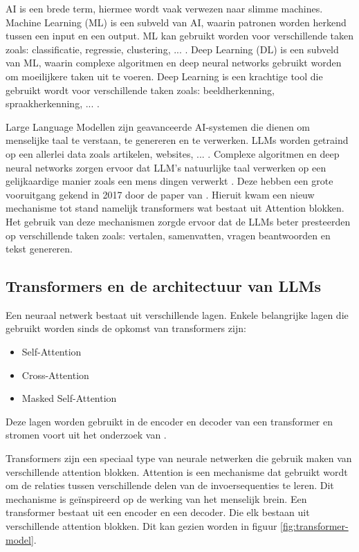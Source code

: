 AI is een brede term, hiermee wordt vaak verwezen naar slimme machines. 
Machine Learning (ML) is een subveld van AI, waarin patronen worden herkend tussen een input en een output.
ML kan gebruikt worden voor verschillende taken zoals: classificatie, regressie, clustering, ... .
Deep Learning (DL) is een subveld van ML, waarin complexe algoritmen en deep neural networks gebruikt worden om moeilijkere taken uit te voeren.
Deep Learning is een krachtige tool die gebruikt wordt voor verschillende taken zoals: beeldherkenning, spraakherkenning, ... \autocite{Stoeffelbauer2023}.

Large Language Modellen zijn geavanceerde AI-systemen die dienen om menselijke taal te verstaan, te genereren en te verwerken.
LLMs worden getraind op een allerlei data zoals artikelen, websites, ... . 
Complexe algoritmen en deep neural networks zorgen ervoor dat LLM's natuurlijke taal verwerken op een gelijkaardige manier zoals een mens dingen verwerkt \autocite{Beelen2023}.
Deze hebben een grote vooruitgang gekend in 2017 door de paper van \textcite{VaswaniEtAl2017}. 
Hieruit kwam een nieuw mechanisme tot stand namelijk transformers wat bestaat uit Attention blokken. 
Het gebruik van deze mechanismen zorgde ervoor dat de LLMs beter presteerden op verschillende taken zoals: vertalen, samenvatten, vragen beantwoorden en tekst genereren.

\subsection{Transformers en de architectuur van LLMs}
\label{sec:architectuur-van-llms}
Een neuraal netwerk bestaat uit verschillende lagen. Enkele belangrijke lagen die gebruikt worden sinds de opkomst van transformers zijn:
\begin{itemize}
  \item Self-Attention
  \item Cross-Attention
  \item Masked Self-Attention
\end{itemize}

Deze lagen worden gebruikt in de encoder en decoder van een transformer en stromen voort uit het onderzoek van \textcite{VaswaniEtAl2017}.

Transformers zijn een speciaal type van neurale netwerken die gebruik maken van verschillende attention blokken.
Attention is een mechanisme dat gebruikt wordt om de relaties tussen verschillende delen van de invoersequenties te leren.
Dit mechanisme is geïnspireerd op de werking van het menselijk brein.
Een transformer bestaat uit een encoder en een decoder. Die elk bestaan uit verschillende attention blokken. 
Dit kan gezien worden in figuur \ref{fig:transformer-model}. 

